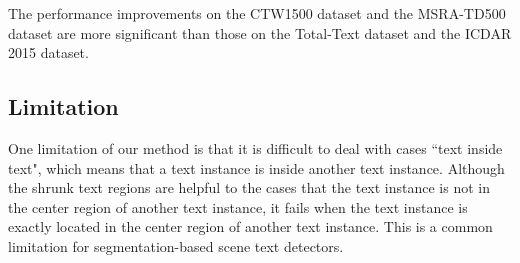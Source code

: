 The performance improvements on the CTW1500 dataset and the MSRA-TD500 dataset are more significant than those on the Total-Text dataset and the ICDAR 2015 dataset. 

\subsection{Limitation}
One limitation of our method is that it is difficult to deal with cases ``text inside text", which means that a text instance is inside another text instance.
Although the shrunk text regions are helpful to the cases that the text instance is not in the center region of another text instance, it fails when the text instance is exactly located in the center region of another text instance. This is a common limitation for segmentation-based scene text detectors.